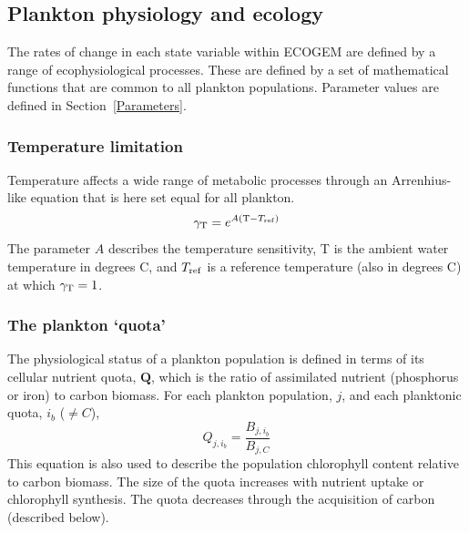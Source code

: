 \documentclass[gmd, manuscript]{copernicus}
\begin{document}

\subsection{Plankton physiology and ecology}\label{PhysiolProc}

The rates of change in each state variable within ECOGEM are defined by a range of ecophysiological processes. These are defined by a set of mathematical functions that are common to all plankton populations. Parameter values are defined in Section~\ref{Parameters}.


\subsubsection{Temperature limitation}

Temperature affects a wide range of metabolic processes through an Arrenhius-like equation that is here set equal for all plankton.
%
\begin{equation}
\gamma_{\rm T} = e^{A ( {\rm T} - T_{\rm ref} )}
\label{tempfunc}
\end{equation}
%
The parameter $A$ describes the temperature sensitivity, T is the ambient water temperature in degrees C, and $T_{\rm ref}$ is a reference temperature (also in degrees C) at which $\gamma_{\rm T}=1$.


\subsubsection{The plankton `quota'}

The physiological status of a plankton population is defined in terms of its cellular nutrient quota, $\mathbf{Q}$, which is the ratio of assimilated nutrient (phosphorus or iron) to carbon biomass. For each plankton population, $j$, and each planktonic quota, $i_b$ ($\ne C$), 
%
\begin{equation}
Q_{j,i_b} = \frac{B_{j,i_b}}{B_{j,C}}
\end{equation}
%
This equation is also used to describe the population chlorophyll content relative to carbon biomass. The size of the quota increases with nutrient uptake or chlorophyll synthesis. The quota decreases through the acquisition of carbon (described below). 
\end{document}
